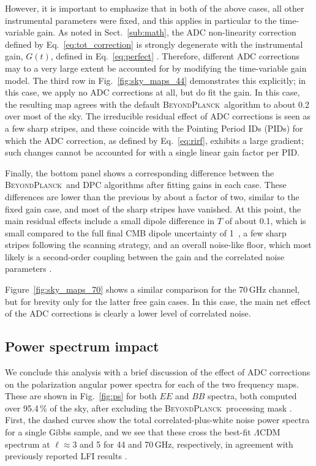 \documentclass[twocolumn]{aa}
\newcommand{\BP}{\textsc{BeyondPlanck}}
\begin{document}
However, it is important to emphasize that in both of the above cases, all other instrumental parameters were fixed, and this applies in particular to the time-variable gain. As noted in Sect.~\ref{sub:math}, the ADC non-linearity correction defined by Eq.~\eqref{eq:tot_correction} is strongly degenerate with the instrumental gain, $G(t)$, defined in Eq.~\eqref{eq:perfect} \citep{bp07}. Therefore, different ADC corrections may to a very large extent be accounted for by modifying the time-variable gain model. The third row in Fig.~\ref{fig:sky_maps_44} demonstrates this explicitly; in this case, we apply no ADC corrections at all, but do fit the gain. In this case, the resulting map agrees with the default \BP\ algorithm to about 0.2\muK\,over most of the sky. The irreducible residual effect of ADC corrections is seen as a few sharp stripes, and these coincide with the Pointing Period IDs (PIDs) for which the ADC correction, as defined by Eq.~\eqref{eq:rirf}, exhibits a large gradient; such changes cannot be accounted for with a single linear gain factor per PID.

Finally, the bottom panel shows a corresponding difference between the \BP\ and DPC algorithms after fitting gains in each case. These differences are lower than the previous by about a factor of two, similar to the fixed gain case, and most of the sharp stripes have vanished. At this point, the main residual effects include a small dipole difference in $T$ of about 0.1\muK, which is small compared to the full final CMB dipole uncertainty of 1\muK\, \citep{bp10}, a few sharp stripes following the scanning strategy, and an overall noise-like floor, which most likely is a second-order coupling between the gain and the correlated noise parameters \citep{bp06}.

Figure~\ref{fig:sky_maps_70} shows a similar comparison for the 70\,GHz channel, but for brevity only for the latter free gain cases. In this case, the main net effect of the ADC corrections is clearly a lower level of correlated noise.

\subsection{Power spectrum impact}\label{sub:ps}

We conclude this analysis with a brief discussion of the effect of ADC corrections on the polarization angular power spectra for each of the two frequency maps. These are shown in Fig.~\ref{fig:ps} for both $EE$ and $BB$ spectra, both computed over 95.4\,\% of the sky, after excluding the \BP\ processing mask \citep{bp06}. First, the dashed curves show the total correlated-plus-white noise power spectra for a single Gibbs sample, and we see that these cross the best-fit $\Lambda$CDM spectrum at $\ell\approx3$ and 5 for 44 and 70\,GHz, respectively, in agreement with previously reported LFI results \citep{planck2016-l02,bp11}.
\end{document}
